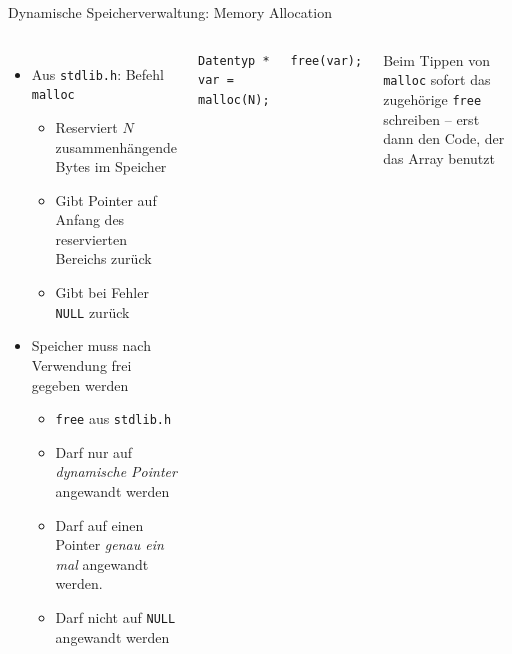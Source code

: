 \begin{frame}[fragile]{Dynamische Speicherverwaltung: Memory Allocation}
%
\begin{columns}[T]
\begin{itemize}
\item Aus \texttt{stdlib.h}: Befehl \texttt{malloc}
	\begin{itemize}
	\item Reserviert $N$ zusammenhängende Bytes im Speicher
	\item Gibt Pointer auf Anfang des reservierten Bereichs zurück
	\item Gibt bei Fehler \texttt{NULL} zurück
	\end{itemize}
\item Speicher muss nach Verwendung frei gegeben werden
\begin{itemize}
	\item \texttt{free} aus \texttt{stdlib.h}
	\item Darf nur auf \emph{dynamische Pointer} angewandt werden
	\item Darf auf einen Pointer \emph{genau ein mal} angewandt werden.
	\item Darf nicht auf \texttt{NULL} angewandt werden
\end{itemize}

\end{itemize}
%
\begin{codebox}
\begin{verbatim}
Datentyp * var = malloc(N);
\end{verbatim}
\end{codebox}
%
\begin{codebox}
\begin{verbatim}
free(var);
\end{verbatim}
\end{codebox}
%
\begin{hintbox}
Beim Tippen von \texttt{malloc} sofort das zugehörige \texttt{free} schreiben -- erst dann den Code, der das Array benutzt
\end{hintbox}
\end{columns}

%
\end{frame}



